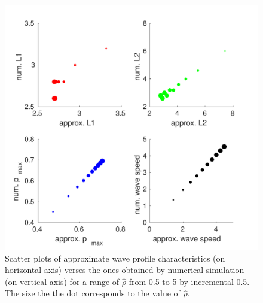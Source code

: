 \documentclass{aims}
\numberwithin{equation}{section}
\begin{document}
\begin{figure}
\begin{center}
\includegraphics[scale=0.7]{plots/scatterplot-new}
\end{center}


\caption{\label{fig:comparison-to-numerical}Scatter plots of approximate wave
profile characteristics (on horizontal axis) verses the ones obtained
by numerical simulation (on vertical axis) for a range of $\hat{\rho}$
from 0.5 to 5 by incremental 0.5. The size the the dot corresponds
to the value of $\hat{\rho}$. }
\end{figure}
 
\end{document}
